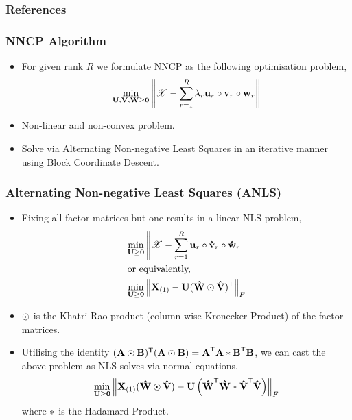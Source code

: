 \documentclass{beamer}
\newcommand{\pr}[1]{\left(#1\right)}
\newcommand{\norm}[1]{\left\lVert#1\right\rVert}
\begin{document}
\begin{frame}[allowframebreaks]
\frametitle{References}
\tiny


\normalsize
\end{frame}

\appendix


\begin{frame}
\frametitle{NNCP Algorithm}
\begin{itemize}
\item For given rank $R$ we formulate NNCP as the following optimisation problem,
\begin{align*}
\underset{\M{U},\M{V},\M{W} \geq \M{0}}{\min}\norm{\T{X}-\sum_{r=1}^R \lambda_r\MC{U}{r}\circ\MC{V}{r}\circ\MC{W}{r}}
\end{align*}
\item Non-linear and non-convex problem.
\item Solve via Alternating Non-negative Least Squares in an iterative manner using Block Coordinate Descent.
\end{itemize}
\end{frame}

\begin{frame}
\frametitle{Alternating Non-negative Least Squares (ANLS)}
\begin{itemize}
\item Fixing all factor matrices but one results in a linear NLS problem,
\begin{align*}
&\underset{\M{U} \geq \M{0}}{\min}\norm{\T{X}-\sum_{r=1}^R \MC{U}{r}\circ\MC[\hat]{V}{r}\circ{\MC[\hat]{W}{r}}} \\
&\textnormal{or equivalently,}\\
&\underset{\M{U} \geq \M{0}}{\min} \norm{\Mz{X}{1} -\M{U}(\M[\hat]{W} \Khat \M[\hat]{V})^\Tra}_F
\end{align*}
\item $\odot$ is the Khatri-Rao product (column-wise Kronecker Product) of the factor matrices.
\item Utilising the identity $(\M{A}\Khat\M{B})^\Tra(\M{A}\Khat\M{B}) = \M{A}^\Tra\M{A} \Hada \M{B}^\Tra\M{B}$, we can cast the above problem as NLS solves via normal equations.
$$\underset{\M{U} \geq \M{0}}{\min} \norm{\Mz{X}{1}(\M[\hat]{W} \Khat \M[\hat]{V}) -\M{U}\pr{\M[\hat]{W}^\Tra\M[\hat]{W} \Hada \M[\hat]{V}^\Tra\M[\hat]{V}}}_F$$
where $\ast$ is the Hadamard Product.
\end{itemize}
\end{frame}
\end{document}
